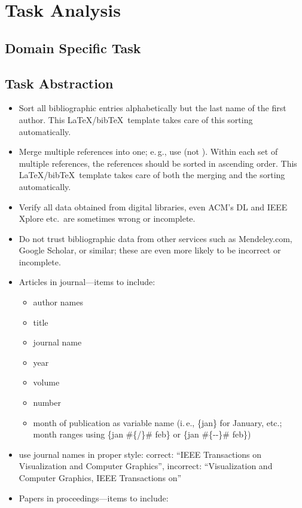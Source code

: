 \documentclass[review]{vgtc}                 %
\begin{document}
\section{Task Analysis}
\subsection{Domain Specific Task}
\subsection{Task Abstraction}

\begin{itemize}
\item Sort all bibliographic entries alphabetically but the last name of the first author. This \LaTeX/bib\TeX\ template takes care of this sorting automatically.
\item Merge multiple references into one; e.\,g., use \cite{Max:1995:OMF,Kitware:2003} (not \cite{Kitware:2003}\cite{Max:1995:OMF}). Within each set of multiple references, the references should be sorted in ascending order. This \LaTeX/bib\TeX\ template takes care of both the merging and the sorting automatically.
\item Verify all data obtained from digital libraries, even ACM's DL and IEEE Xplore  etc.\ are sometimes wrong or incomplete.
\item Do not trust bibliographic data from other services such as Mendeley.com, Google Scholar, or similar; these are even more likely to be incorrect or incomplete.
\item Articles in journal---items to include:
  \begin{itemize}
  \item author names
	\item title
	\item journal name
	\item year
	\item volume
	\item number
	\item month of publication as variable name (i.\,e., \{jan\} for January, etc.; month ranges using \{jan \#\{/\}\# feb\} or \{jan \#\{-{}-\}\# feb\})
  \end{itemize}
\item use journal names in proper style: correct: ``IEEE Transactions on Visualization and Computer Graphics'', incorrect: ``Visualization and Computer Graphics, IEEE Transactions on''
\item Papers in proceedings---items to include:

\end{itemize}
\end{document}
